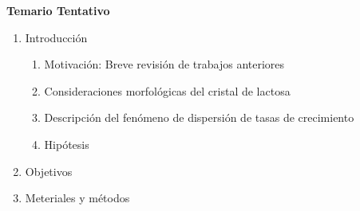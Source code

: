 
\textbf{Temario Tentativo}
\begin{enumerate}
\item Introducción
\begin{enumerate}
	\item Motivación: Breve revisión de trabajos anteriores
	\item Consideraciones morfológicas del cristal de lactosa
	\item Descripción del fenómeno de dispersión de tasas de crecimiento
	\item Hipótesis
\end{enumerate}
\item Objetivos
\item Meteriales y métodos
\end{enumerate}


